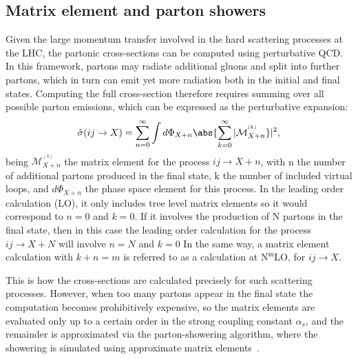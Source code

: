 \subsection*{Matrix element and parton showers}
\label{subsec:parton_shower}
Given the large momentum transfer involved in the hard scattering processes at the LHC, the partonic cross-sections can be computed using perturbative QCD. In this framework, partons may radiate additional gluons and split into further partons, which in turn can emit yet more radiation both in the initial and final states. Computing the full cross-section therefore requires summing over all possible parton emissions, which can be expressed as the perturbative expansion:
\begin{equation}
\hat{\sigma}(ij\rightarrow X) = \sum_{n=0}^{\infty}\int d\Phi_{X+n}\abs{\sum_{k=0}^{\infty}|\mathcal{M}_{X+n}^{^{(k)}}}|^2,
\end{equation}
being $\mathcal{M}_{X+n}^{^{(k)}}$ the matrix element for the process $ij \rightarrow X + n$, with n the number of additional partons produced in the final state, k the number of included virtual loops, and $d\Phi_{X+n}$ the phase space element for this process.
In the leading order calculation (LO), it only includes tree level matrix elements so it would correspond to $n=0$ and $k=0$. If it involves the production of N partons in the final state, then in this case the leading order calculation for the process $ij \rightarrow X+N$ will involve $n=N$ and $k=0$
In the same way, a matrix element calculation with $k + n = m$ is referred to as a calculation at $\text{N}^{\text{m}}$LO, for $ij \rightarrow X$.

This is how the cross-sections are calculated precisely for such scattering processes. However, when too many partons appear in the final state the computation becomes prohibitively expensive, so the matrix elements are evaluated only up to a certain order in the strong coupling constant
 $\alpha_{s}$, and the remainder is approximated via the parton-showering algorithm, where the showering is simulated using approximate matrix elements~\cite{FOX1980285}.

